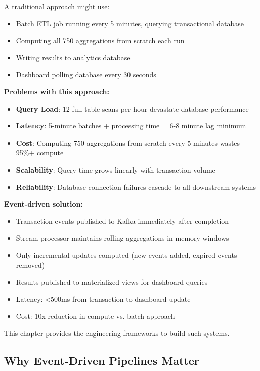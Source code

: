 A traditional approach might use:
\begin{itemize}
    \item Batch ETL job running every 5 minutes, querying transactional database
    \item Computing all 750 aggregations from scratch each run
    \item Writing results to analytics database
    \item Dashboard polling database every 30 seconds
\end{itemize}

\textbf{Problems with this approach:}
\begin{itemize}
    \item \textbf{Query Load}: 12 full-table scans per hour devastate database performance
    \item \textbf{Latency}: 5-minute batches + processing time = 6-8 minute lag minimum
    \item \textbf{Cost}: Computing 750 aggregations from scratch every 5 minutes wastes 95\%+ compute
    \item \textbf{Scalability}: Query time grows linearly with transaction volume
    \item \textbf{Reliability}: Database connection failures cascade to all downstream systems
\end{itemize}

\textbf{Event-driven solution:}
\begin{itemize}
    \item Transaction events published to Kafka immediately after completion
    \item Stream processor maintains rolling aggregations in memory windows
    \item Only incremental updates computed (new events added, expired events removed)
    \item Results published to materialized views for dashboard queries
    \item Latency: <500ms from transaction to dashboard update
    \item Cost: 10x reduction in compute vs. batch approach
\end{itemize}

This chapter provides the engineering frameworks to build such systems.

\subsection{Why Event-Driven Pipelines Matter}

